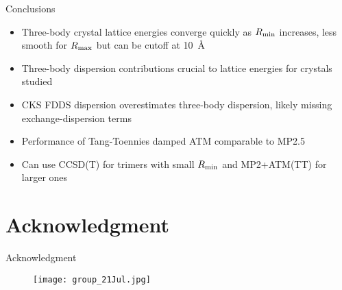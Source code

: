 \documentclass{beamer}
\begin{document}
    \begin{frame}{Conclusions}
       \begin{itemize}
            \item Three-body crystal lattice energies converge quickly as $R_{\rm{min}}$ increases, less smooth for $R_{\rm{max}}$ but can be cutoff at 10~\AA
            \item Three-body dispersion contributions crucial to lattice energies for crystals studied
            \item CKS FDDS dispersion overestimates three-body dispersion, likely missing exchange-dispersion terms
            \item Performance of Tang-Toennies damped ATM comparable to MP2.5
            \item Can use CCSD(T) for trimers with small $R_{\rm{min}}$ and MP2+ATM(TT) for larger ones
       \end{itemize}
    \end{frame}

\section{Acknowledgment}

    \begin{frame}{Acknowledgment}
        \begin{figure}
            \centering
            \texttt{[image: group\_21Jul.jpg]}
        \end{figure}
    \end{frame}
    
\end{document}
